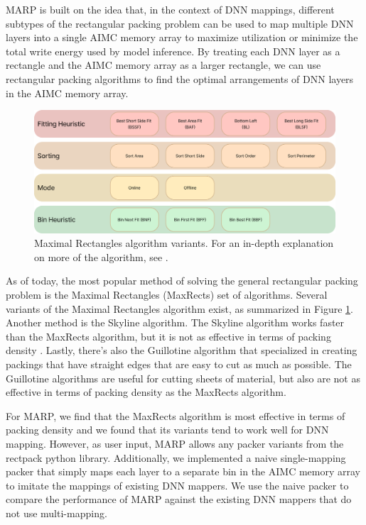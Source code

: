 MARP is built on the idea that, in the context of DNN mappings, different subtypes of the rectangular packing problem can be used to map multiple DNN layers into a single AIMC memory array to maximize utilization or minimize the total write energy used by model inference. By treating each DNN layer as a rectangle and the AIMC memory array as a larger rectangle, we can use rectangular packing algorithms to find the optimal arrangements of DNN layers in the AIMC memory array.

\begin{figure}[htbp]
    \centering
    \includegraphics[width=\textwidth]{images/marp/rectpack_heuristics.png}
    \caption{Maximal Rectangles algorithm variants. For an in-depth explanation on more of the algorithm, see \cite{jylanki2010thousand}.}
    \label{fig:maximal_rectangles_variants}
\end{figure}

As of today, the most popular method of solving the general rectangular packing problem is the Maximal Rectangles (MaxRects) set of algorithms. Several variants of the Maximal Rectangles algorithm exist, as summarized in Figure \ref{fig:maximal_rectangles_variants}. Another method is the Skyline algorithm. The Skyline algorithm works faster than the MaxRects algorithm, but it is not as effective in terms of packing density \cite{jylanki2010thousand}. Lastly, there's also the Guillotine algorithm that specialized in creating packings that have straight edges that are easy to cut as much as possible. The Guillotine algorithms are useful for cutting sheets of material, but also are not as effective in terms of packing density as the MaxRects algorithm.  

For MARP, we find that the MaxRects algorithm is most effective in terms of packing density and we found that its variants tend to work well for DNN mapping. However, as user input, MARP allows any packer variants from the rectpack python library. Additionally, we implemented a naive single-mapping packer that simply maps each layer to a separate bin in the AIMC memory array to imitate the mappings of existing DNN mappers. We use the naive packer to compare the performance of MARP against the existing DNN mappers that do not use multi-mapping.


